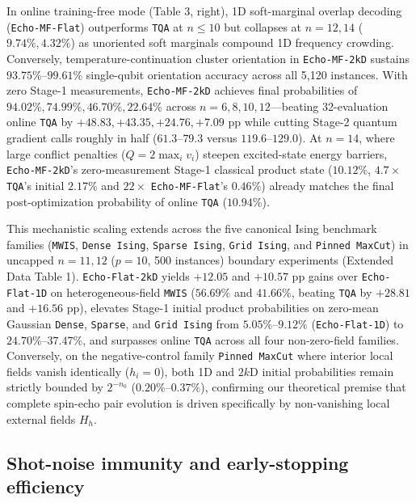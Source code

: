 \documentclass[10pt,a4paper]{article}
\begin{document}
In online training-free mode (Table 3, right), 1D soft-marginal overlap decoding (\texttt{Echo-MF-Flat}) outperforms \texttt{TQA} at $n \le 10$ but collapses at $n=12, 14$ ($9.74\%, 4.32\%$) as unoriented soft marginals compound 1D frequency crowding. Conversely, temperature-continuation cluster orientation in \texttt{Echo-MF-2kD} sustains $93.75\%\mbox{--}99.61\%$ single-qubit orientation accuracy across all 5,120 instances. With zero Stage-1 measurements, \texttt{Echo-MF-2kD} achieves final probabilities of $\mathbf{94.02}\%, \mathbf{74.99}\%, \mathbf{46.70}\%, \mathbf{22.64}\%$ across $n=6, 8, 10, 12$---beating 32-evaluation online \texttt{TQA} by $\mathbf{+48.83}, \mathbf{+43.35}, \mathbf{+24.76}, \mathbf{+7.09}$ pp while cutting Stage-2 quantum gradient calls roughly in half ($\mathbf{61.3\mbox{--}79.3}$ versus $119.6\mbox{--}129.0$). At $n=14$, where large conflict penalties ($Q = 2\max_i v_i$) steepen excited-state energy barriers, \texttt{Echo-MF-2kD}'s zero-measurement Stage-1 classical product state ($\mathbf{10.12}\%$, $4.7\times$ \texttt{TQA}'s initial $2.17\%$ and $22\times$ \texttt{Echo-MF-Flat}'s $0.46\%$) already matches the final post-optimization probability of online \texttt{TQA} ($10.94\%$).

This mechanistic scaling extends across the five canonical Ising benchmark families (\texttt{MWIS}, \texttt{Dense Ising}, \texttt{Sparse Ising}, \texttt{Grid Ising}, and \texttt{Pinned MaxCut}\citep{yao2026echo}) in uncapped $n=11, 12$ ($p=10$, 500 instances) boundary experiments (Extended Data Table 1). \texttt{Echo-Flat-2kD} yields $+12.05$ and $+10.57$ pp gains over \texttt{Echo-Flat-1D} on heterogeneous-field \texttt{MWIS} ($\mathbf{56.69}\%$ and $\mathbf{41.66}\%$, beating \texttt{TQA} by $\mathbf{+28.81}$ and $\mathbf{+16.56}$ pp), elevates Stage-1 initial product probabilities on zero-mean Gaussian \texttt{Dense}, \texttt{Sparse}, and \texttt{Grid Ising} from $5.05\%\mbox{--}9.12\%$ (\texttt{Echo-Flat-1D}) to $24.70\%\mbox{--}37.47\%$, and surpasses online \texttt{TQA} across all four non-zero-field families. Conversely, on the negative-control family \texttt{Pinned MaxCut} where interior local fields vanish identically ($h_i = 0$), both 1D and $2k$D initial probabilities remain strictly bounded by $2^{-n_0}$ ($0.20\%\mbox{--}0.37\%$), confirming our theoretical premise that complete spin-echo pair evolution is driven specifically by non-vanishing local external fields $H_h$.


\subsection*{Shot-noise immunity and early-stopping efficiency}
\end{document}

